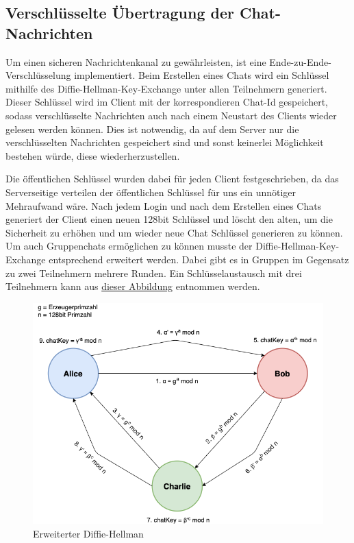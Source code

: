 \author{Troy Keßler, Michael Angermeier}
\subsection{Verschlüsselte Übertragung der Chat-Nachrichten}\label{encryption}
Um einen sicheren Nachrichtenkanal zu gewährleisten, ist eine Ende-zu-Ende-Verschlüsselung implementiert. 
Beim Erstellen eines Chats wird ein Schlüssel mithilfe des Diffie-Hellman-Key-Exchange unter allen Teilnehmern generiert.
Dieser Schlüssel wird im Client mit der korrespondieren Chat-Id gespeichert, sodass verschlüsselte Nachrichten
auch nach einem Neustart des Clients wieder gelesen werden können. Dies ist notwendig, da auf dem Server nur die verschlüsselten
Nachrichten gespeichert sind und sonst keinerlei Möglichkeit bestehen würde, diese wiederherzustellen. 

Die öffentlichen Schlüssel wurden dabei für jeden Client festgeschrieben, da das Serverseitige verteilen der öffentlichen Schlüssel für uns ein unnötiger Mehraufwand wäre.
Nach jedem Login und nach dem Erstellen eines Chats generiert der Client einen neuen 128bit Schlüssel und löscht den alten, um die Sicherheit zu erhöhen und um wieder neue Chat Schlüssel generieren zu können.
Um auch Gruppenchats ermöglichen zu können musste der Diffie-Hellman-Key-Exchange entsprechend erweitert werden.
Dabei gibt es in Gruppen im Gegensatz zu zwei Teilnehmern mehrere Runden.
Ein Schlüsselaustausch mit drei Teilnehmern kann aus \hyperref[DHKE]{dieser Abbildung} entnommen werden.

\begin{figure}[h]
  \centering
  \includegraphics[width=\textwidth]{dh.png}
  
  \caption{Erweiterter Diffie-Hellman}
  \label{DHKE}
\end{figure}

